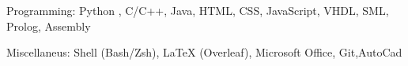 

\begin{cvhonors}

  \cvhonor
    {Programming: } %
    {Python , C/C++, Java, HTML, CSS, JavaScript, VHDL, SML, Prolog, Assembly} %
    {} %
    {} %

  \cvhonor
    {Miscellaneus: } %
    {Shell (Bash/Zsh), LaTeX (Overleaf),  Microsoft Office, Git,AutoCad} %
    {} %
    {} %

\end{cvhonors}
